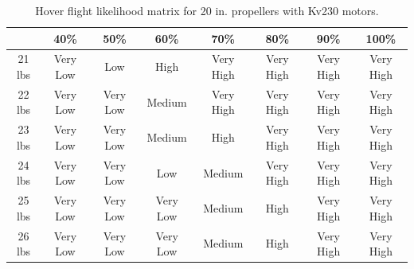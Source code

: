 \documentclass{article}
\begin{document}
\begin{table}[h]
    \centering
    \begin{tabular}{|c|c|c|c|c|c|c|c|}
        \hline
 & 40\% & 50\% & 60\% & 70\% & 80\% & 90\% & 100\%  \\
        \hline
        21 lbs & \cellcolor{red!80} Very Low & \cellcolor{red!20} Low & \cellcolor{ForestGreen!40} High & \cellcolor{ForestGreen!80} Very High & \cellcolor{ForestGreen!80} Very High & \cellcolor{ForestGreen!80} Very High & \cellcolor{ForestGreen!80} Very High \\
        \hline
        22 lbs & \cellcolor{red!80} Very Low & \cellcolor{red!80} Very Low & \cellcolor{yellow!60} Medium & \cellcolor{ForestGreen!80} Very High & \cellcolor{ForestGreen!80} Very High & \cellcolor{ForestGreen!80} Very High & \cellcolor{ForestGreen!80} Very High \\
        \hline
        23 lbs & \cellcolor{red!80} Very Low & \cellcolor{red!80} Very Low & \cellcolor{yellow!60} Medium & \cellcolor{ForestGreen!40} High & \cellcolor{ForestGreen!80} Very High & \cellcolor{ForestGreen!80} Very High & \cellcolor{ForestGreen!80} Very High \\
        \hline
        24 lbs & \cellcolor{red!80} Very Low & \cellcolor{red!80} Very Low & \cellcolor{red!20} Low & \cellcolor{yellow!60} Medium & \cellcolor{ForestGreen!80} Very High & \cellcolor{ForestGreen!80} Very High & \cellcolor{ForestGreen!80} Very High \\
        \hline
        25 lbs & \cellcolor{red!80} Very Low & \cellcolor{red!80} Very Low & \cellcolor{red!80} Very Low & \cellcolor{yellow!60} Medium & \cellcolor{ForestGreen!40} High & \cellcolor{ForestGreen!80} Very High & \cellcolor{ForestGreen!80} Very High \\
        \hline
        26 lbs & \cellcolor{red!80} Very Low & \cellcolor{red!80} Very Low & \cellcolor{red!80} Very Low & \cellcolor{yellow!60} Medium & \cellcolor{ForestGreen!40} High & \cellcolor{ForestGreen!80} Very High & \cellcolor{ForestGreen!80} Very High \\
        \hline
    \end{tabular}
    \caption{Hover flight likelihood matrix for 20 in. propellers with Kv230 motors.}
    \label{tab:hover_likelihood_matrix_20}
\end{table}
\end{document}
